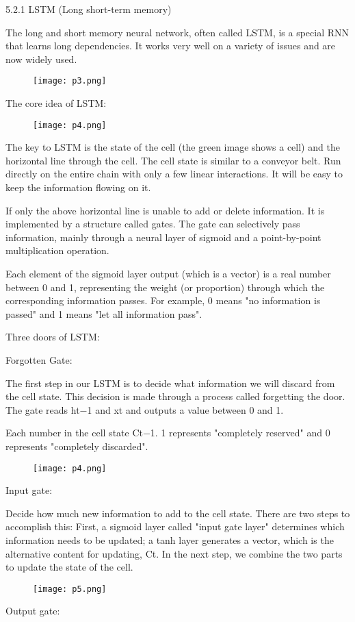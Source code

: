 \documentclass{acmtog} %
\begin{document}
5.2.1 LSTM (Long short-term memory)

The long and short memory neural network, often called LSTM, is a special RNN that learns long dependencies. It works very well on a variety of issues and are now widely used.
%
\begin{figure}[h]
\centerline{\texttt{[image: p3.png]}}
\end{figure}
%
The core idea of LSTM:
%
\begin{figure}[h]
\centerline{\texttt{[image: p4.png]}}
\end{figure}
%
The key to LSTM is the state of the cell (the green image shows a cell) and the horizontal line through the cell. The cell state is similar to a conveyor belt. Run directly on the entire chain with only a few linear interactions. It will be easy to keep the information flowing on it.

If only the above horizontal line is unable to add or delete information. It is implemented by a structure called gates. The gate can selectively pass information, mainly through a neural layer of sigmoid and a point-by-point multiplication operation.

Each element of the sigmoid layer output (which is a vector) is a real number between 0 and 1, representing the weight (or proportion) through which the corresponding information passes. For example, 0 means "no information is passed" and 1 means "let all information pass".

Three doors of LSTM:

Forgotten Gate:

The first step in our LSTM is to decide what information we will discard from the cell state. This decision is made through a process called forgetting the door. The gate reads ht−1 and xt and outputs a value between 0 and 1.

Each number in the cell state Ct−1. 1 represents "completely reserved" and 0 represents "completely discarded".
%
\begin{figure}[h]
\centerline{\texttt{[image: p4.png]}}
\end{figure}
%
Input gate:

Decide how much new information to add to the cell state. There are two steps to accomplish this: First, a sigmoid layer called "input gate layer" determines which information needs to be updated; a tanh layer generates a vector, which is the alternative content for updating, Ct. In the next step, we combine the two parts to update the state of the cell.
%
\begin{figure}[h]
\centerline{\texttt{[image: p5.png]}}
\end{figure}
%
Output gate:
\end{document}
